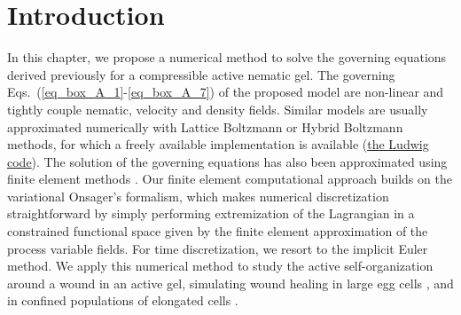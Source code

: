 \section{Introduction}

In this chapter, we propose a numerical method to solve the governing equations derived previously for a compressible active nematic gel.  The governing Eqs.~(\ref{eq_box_A_1}-\ref{eq_box_A_7}) of the proposed model are non-linear and tightly couple nematic, velocity and density fields. Similar models are usually approximated numerically with  Lattice Boltzmann \cite{marenduzzo2007,cates2009} or Hybrid Boltzmann  \cite{desplat2001} methods, for which a freely available  implementation is available (\href{https://github.com/ludwig-cf/ludwig}{the Ludwig code}). The solution of the governing equations has also been approximated using finite element methods \cite{goudiaby2021,becker2008, norton2018}. Our finite element computational approach builds on the variational Onsager's formalism, which makes numerical discretization straightforward by simply performing extremization of the Lagrangian in a constrained functional space given by the finite element approximation of the process variable fields. For time discretization, we resort to the  implicit Euler method. We apply  this numerical method to study the active self-organization around a wound in an active gel, simulating wound healing in large egg cells \cite{benink2000,mandato2001}, and in confined populations of elongated cells \cite{duclos2014}.







